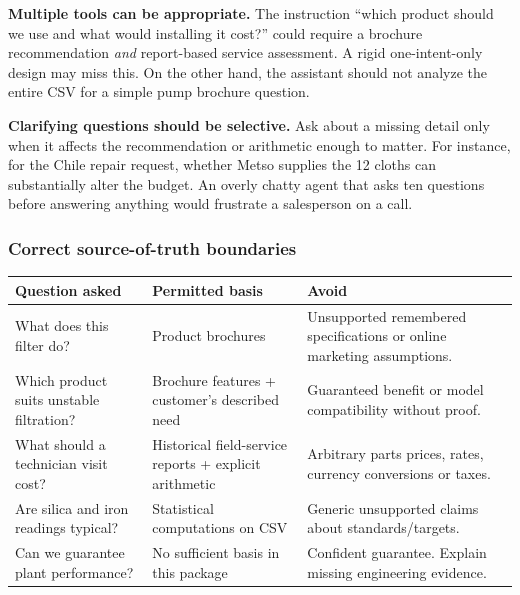 \documentclass[11pt,a4paper]{article}
\begin{document}
\textbf{Multiple tools can be appropriate.} The instruction ``which product should we use and what would installing it cost?'' could require a brochure recommendation \emph{and} report-based service assessment. A rigid one-intent-only design may miss this. On the other hand, the assistant should not analyze the entire CSV for a simple pump brochure question.

\textbf{Clarifying questions should be selective.} Ask about a missing detail only when it affects the recommendation or arithmetic enough to matter. For instance, for the Chile repair request, whether Metso supplies the 12 cloths can substantially alter the budget. An overly chatty agent that asks ten questions before answering anything would frustrate a salesperson on a call.

\subsubsection{Correct source-of-truth boundaries}
\begin{tabularx}{\textwidth}{@{}L{39mm}L{45mm}Y@{}}
\toprule\textbf{Question asked} & \textbf{Permitted basis} & \textbf{Avoid}\\\midrule
What does this filter do? & Product brochures & Unsupported remembered specifications or online marketing assumptions.\\
Which product suits unstable filtration? & Brochure features + customer's described need & Guaranteed benefit or model compatibility without proof.\\
What should a technician visit cost? & Historical field-service reports + explicit arithmetic & Arbitrary parts prices, rates, currency conversions or taxes.\\
Are silica and iron readings typical? & Statistical computations on CSV & Generic unsupported claims about standards/targets.\\
Can we guarantee plant performance? & No sufficient basis in this package & Confident guarantee. Explain missing engineering evidence.\\
\bottomrule
\end{tabularx}
\end{document}
